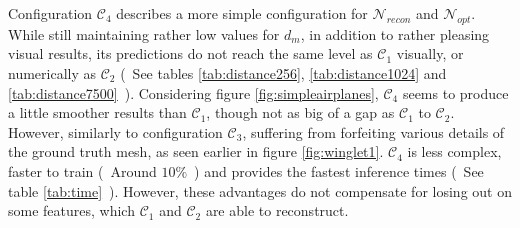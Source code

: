   Configuration $\mathcal{C}_4$ describes a more simple configuration for $\mathcal{N}_{recon}$ and $\mathcal{N}_{opt}$. While still maintaining rather
  low values for $d_m$, in addition to rather pleasing visual results, its predictions do not reach the same level as $\mathcal{C}_1$ visually, or numerically
  as $\mathcal{C}_2$ (~See tables \ref{tab:distance256}, \ref{tab:distance1024} and \ref{tab:distance7500}~). 
  Considering figure \ref{fig:simpleairplanes}, $\mathcal{C}_4$ seems to produce a little smoother results than $\mathcal{C}_1$, though not as big of a gap as $\mathcal{C}_1$ 
  to $\mathcal{C}_2$. However, similarly to configuration $\mathcal{C}_3$, suffering from forfeiting various details of the ground truth mesh, as seen earlier in figure
  \ref{fig:winglet1}. $\mathcal{C}_4$ is less complex, faster to train (~Around $10\%$~) and provides the fastest inference times (~See table \ref{tab:time}~). However, 
  these advantages do not compensate for losing out on some features, which $\mathcal{C}_1$ and $\mathcal{C}_2$ are able to reconstruct.


